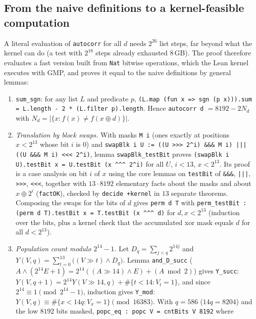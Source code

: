 \documentclass[11pt]{article}
\numberwithin{equation}{section}
\theoremstyle{definition}
\theoremstyle{remark}
\begin{document}
\subsection{From the naive definitions to a kernel-feasible computation}
A literal evaluation of \texttt{autocorr} for all $d$ needs $2^{26}$ list steps, far beyond what the kernel
can do (a test with $2^{18}$ steps already exhausted 8\,GB). The proof therefore evaluates a fast version
built from \texttt{Nat} bitwise operations, which the Lean kernel executes with GMP, and proves it equal to
the naive definitions by general lemmas:
\begin{enumerate}
\item \texttt{sum\_sgn}: for any list $L$ and predicate $p$, \texttt{(L.map (fun x => sgn (p x))).sum =
L.length - 2 * (L.filter p).length}. Hence \texttt{autocorr d} $=8192-2N_d$ with
$N_d=|\{x:f(x)\ne f(x\oplus d)\}|$.
\item \emph{Translation by block swaps.} With masks
\texttt{M i} (ones exactly at positions $x<2^{13}$ whose bit $i$ is $0$) and
\texttt{swapBlk i U := ((U >{}>{}> 2\textasciicircum{}i) \&\&\& M i) ||| ((U \&\&\& M i) <{}<{}< 2\textasciicircum{}i)}, lemma
\texttt{swapBlk\_testBit} proves \texttt{(swapBlk i U).testBit x = U.testBit (x \textasciicircum{}\textasciicircum{}\textasciicircum{} 2\textasciicircum{}i)} for all
$U$, $i<13$, $x<2^{13}$. Its proof is a case analysis on bit $i$ of $x$ using the core lemmas on
\texttt{testBit} of \texttt{\&\&\&}, \texttt{|||}, \texttt{>{}>{}>}, \texttt{<{}<{}<}, together with $13\cdot 8192$
elementary facts about the masks and about $x\oplus 2^i$ (\texttt{factOK}), checked by \texttt{decide +kernel}
in $13$ separate theorems. Composing the swaps for the bits of $d$ gives \texttt{perm d T} with
\texttt{perm\_testBit : (perm d T).testBit x = T.testBit (x \textasciicircum{}\textasciicircum{}\textasciicircum{} d)} for $d,x<2^{13}$ (induction over
the bits, plus a kernel check that the accumulated xor mask equals $d$ for all $d<2^{13}$).
\item \emph{Population count modulo $2^{14}-1$.} Let $D_q=\sum_{j<q}2^{14j}$ and
$Y(V,q)=\sum_{t=0}^{13}\bigl((V\gg t)\wedge D_q\bigr)$. Lemma \texttt{and\_D\_succ}
($A\wedge(2^{14}E+1)=2^{14}((A\gg 14)\wedge E)+(A\bmod 2)$) gives \texttt{Y\_succ}:
$Y(V,q+1)=2^{14}Y(V\gg14,q)+\#\{t<14: V_t=1\}$, and since $2^{14}\equiv1\pmod{2^{14}-1}$, induction gives
\texttt{Y\_mod}: $Y(V,q)\equiv \#\{x<14q:V_x=1\}\pmod{16383}$. With $q=586$ ($14q=8204$) and the low
$8192$ bits masked, \texttt{popc\_eq : popc V = cntBits V 8192} where

\end{enumerate}
\end{document}
